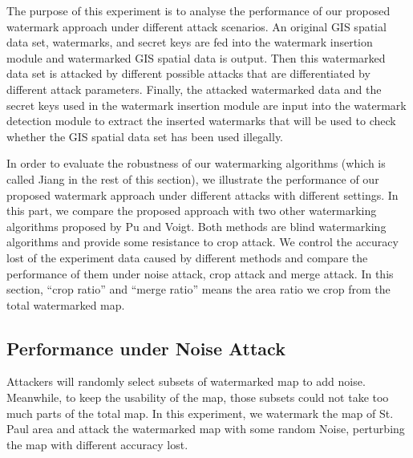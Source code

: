The purpose of this experiment is to analyse the performance of our proposed 
watermark approach under different attack scenarios. An original GIS spatial 
data set, watermarks, and secret keys are fed into the watermark insertion 
module and watermarked GIS spatial data is output. Then this watermarked data 
set is attacked by different possible attacks that are differentiated by 
different attack parameters. Finally, the attacked watermarked data and the 
secret keys used in the watermark insertion module are input into the watermark 
detection module to extract the inserted watermarks that will be used to check 
whether the GIS spatial data set has been used illegally.



In order to evaluate the robustness of our watermarking algorithms (which is called
Jiang in the rest of this section), we illustrate 
the performance of our proposed watermark approach under different attacks with 
different settings. In this part, we compare the proposed approach with two other 
watermarking algorithms proposed by Pu\cite{PuDJ06} and 
Voigt\cite{Vogit:2003}. Both methods are blind watermarking algorithms and provide 
some resistance to crop attack. We control the accuracy lost of the experiment data 
caused by different methods and compare the performance of them under noise attack, 
crop attack and merge attack. In this section, ``crop ratio'' and ``merge ratio'' 
means the area ratio we crop from the total watermarked map.

\subsection{Performance under Noise Attack}
Attackers will randomly select subsets of watermarked map to add noise. Meanwhile, to 
keep the usability of the map, those subsets could not take too much parts of the total 
map. In this experiment, we watermark the map of St. Paul area and attack the watermarked 
map with some random Noise, perturbing the map with different accuracy lost. 

